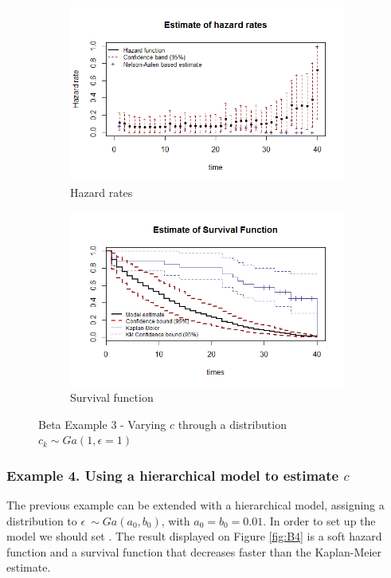 \documentclass[letterpaper]{article}
\begin{document}
\begin{figure}
  \centering
  \begin{subfigure}[a]{\textwidth}\centering
    \includegraphics[width=\textwidth]{B31.png}
    \caption{Hazard rates}
  \end{subfigure}
  \begin{subfigure}[b]{\textwidth}\centering
    \includegraphics[width=\textwidth]{B32.png}
    \caption{Survival function}
  \end{subfigure}
  \caption{Beta Example 3 - Varying $c$ through a distribution $c_k\sim Ga(1,\epsilon = 1)$}
  \label{fig:B3}
\end{figure}

\subsubsection{Example 4. Using a hierarchical model to estimate $c$}

The previous example can be extended with a hierarchical model, assigning a distribution to $\epsilon ~ \sim Ga(a_0,b_0)$, with $a_0=b_0=0.01$. In order to set up the model we should set . The result displayed on Figure \ref{fig:B4} is a soft hazard function and a survival function that decreases faster than the Kaplan-Meier estimate.
\end{document}

